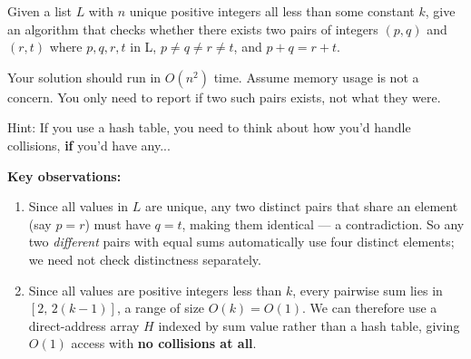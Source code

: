 \documentclass[addpoints]{exam}
\begin{document}
\begin{questions}


\question[10] Given a list $L$ with $n$ unique positive integers all less than some constant $k$, give an algorithm that checks whether there exists two pairs of integers $(p, q)$ and $(r, t)$ where $p,q,r,t$ in L, $p \neq q \neq r \neq t$, and $p + q = r + t$.

Your solution should run in $O(n^2)$ time. Assume memory usage is not a concern. You only need to report if two such pairs exists, not what they were.

Hint: If you use a hash table, you need to think about how you'd handle collisions, \textbf{if} you'd have any...

\textbf{Key observations:}
\begin{enumerate}
  \item Since all values in $L$ are unique, any two distinct pairs that share an element (say $p = r$) must have $q = t$, making them identical --- a contradiction. So any two \emph{different} pairs with equal sums automatically use four distinct elements; we need not check distinctness separately.
  \item Since all values are positive integers less than $k$, every pairwise sum lies in $[2,\, 2(k-1)]$, a range of size $O(k) = O(1)$. We can therefore use a direct-address array $H$ indexed by sum value rather than a hash table, giving $O(1)$ access with \textbf{no collisions at all}.
\end{enumerate}


\end{questions}
\end{document}
